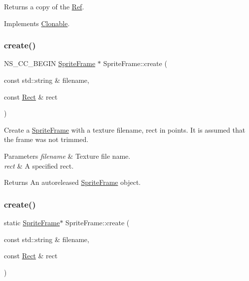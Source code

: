 Returns a copy of the \hyperlink{classRef}{Ref}. 

Implements \hyperlink{classClonable_a36b05a0fa605f4f269e5884bde7f9e0c}{Clonable}.

\mbox{\label{classSpriteFrame_a33140f4cbd3734f8edf432047ce7db57}} 
\subsubsection{\texorpdfstring{create()}{create()}\hspace{0.1cm}{\footnotesize\ttfamily [1/4]}}
{\footnotesize\ttfamily N\+S\+\_\+\+C\+C\+\_\+\+B\+E\+G\+IN \hyperlink{classSpriteFrame}{Sprite\+Frame} $\ast$ Sprite\+Frame\+::create (\begin{DoxyParamCaption}\item[{const std\+::string \&}]{filename,  }\item[{const \hyperlink{classRect}{Rect} \&}]{rect }\end{DoxyParamCaption})\hspace{0.3cm}{\ttfamily [static]}}

Create a \hyperlink{classSpriteFrame}{Sprite\+Frame} with a texture filename, rect in points. It is assumed that the frame was not trimmed.


\begin{DoxyParams}{Parameters}
{\em filename} & Texture file name. \\
\hline
{\em rect} & A specified rect. \\
\hline
\end{DoxyParams}
\begin{DoxyReturn}{Returns}
An autoreleased \hyperlink{classSpriteFrame}{Sprite\+Frame} object. 
\end{DoxyReturn}
\mbox{\label{classSpriteFrame_acfa88af9f8d790e64bc5130f88189a37}} 
\subsubsection{\texorpdfstring{create()}{create()}\hspace{0.1cm}{\footnotesize\ttfamily [2/4]}}
{\footnotesize\ttfamily static \hyperlink{classSpriteFrame}{Sprite\+Frame}$\ast$ Sprite\+Frame\+::create (\begin{DoxyParamCaption}\item[{const std\+::string \&}]{filename,  }\item[{const \hyperlink{classRect}{Rect} \&}]{rect }\end{DoxyParamCaption})\hspace{0.3cm}{\ttfamily [static]}}

